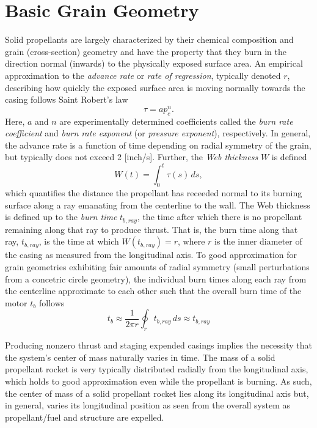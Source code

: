 \documentclass[11pt,dvipsnames]{thesis}
\begin{document}
\section{Basic Grain Geometry}
Solid propellants are largely characterized by their chemical composition and grain (cross-section) geometry and have the property that they burn in the direction normal (inwards) to the physically exposed surface area. An empirical approximation to the \textit{advance rate} or \textit{rate of regression}, typically denoted $r$, describing how quickly the exposed surface area is moving normally towards the casing follows Saint Robert's law
\begin{equation}
\tau = a p_c^n.
\end{equation}
Here, $a$ and $n$ are experimentally determined coefficients called the \textit{burn rate coefficient} and \textit{burn rate exponent} (or \textit{pressure exponent}), respectively. In general, the advance rate is a function of time depending on radial symmetry of the grain, but typically does not exceed 2 [inch/s].
%
Further, the \textit{Web thickness} $W$ is defined
\begin{equation}
W(t) = \int_0^{t} \tau(s) \,ds,
\end{equation}
which quantifies the distance the propellant has receeded normal to its burning surface along a ray emanating from the centerline to the wall. The Web thickness is defined up to the \textit{burn time} $t_{b,ray}$, the time after which there is no propellant remaining along that ray to produce thrust. That is, the burn time along that ray, $t_{b,ray}$, is the time at which $W(t_{b,ray}) = r$, where $r$ is the inner diameter of the casing as measured from the longitudinal axis.
%
To good approximation for grain geometries exhibiting fair amounts of radial symmetry (small perturbations from a concetric circle geometry), the individual burn times along each ray from the centerline approximate to each other such that the overall burn time of the motor $t_b$ follows 
\begin{equation}
t_b \approx \frac{1}{2\pi r}\oint_{r} t_{b,ray} \,ds \approx t_{b,ray}
\end{equation}

Producing nonzero thrust and staging expended casings implies the necessity that the system's center of mass naturally varies in time.
The mass of a solid propellant rocket is very typically distributed radially from the longitudinal axis, which holds to good approximation even while the propellant is burning. As such, the center of mass of a solid propellant rocket lies along its longitudinal axis but, in general, varies its longitudinal position as seen from the overall system as propellant/fuel and structure are expelled.
\end{document}
